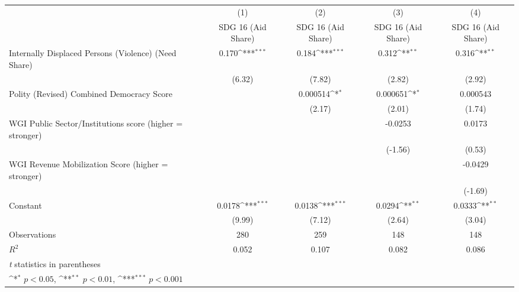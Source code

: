 {
\def\sym#1{\ifmmode^{#1}\else\(^{#1}\)\fi}
\begin{tabular}{l*{4}{c}}
\hline\hline
                &\multicolumn{1}{c}{(1)}&\multicolumn{1}{c}{(2)}&\multicolumn{1}{c}{(3)}&\multicolumn{1}{c}{(4)}\\
                &\multicolumn{1}{c}{SDG 16 (Aid Share)}&\multicolumn{1}{c}{SDG 16 (Aid Share)}&\multicolumn{1}{c}{SDG 16 (Aid Share)}&\multicolumn{1}{c}{SDG 16 (Aid Share)}\\
\hline
Internally Displaced Persons (Violence) (Need Share)&    0.170\sym{***}&    0.184\sym{***}&    0.312\sym{**} &    0.316\sym{**} \\
                &   (6.32)         &   (7.82)         &   (2.82)         &   (2.92)         \\
[1em]
Polity (Revised) Combined Democracy Score&                  & 0.000514\sym{*}  & 0.000651\sym{*}  & 0.000543         \\
                &                  &   (2.17)         &   (2.01)         &   (1.74)         \\
[1em]
WGI Public Sector/Institutions score (higher = stronger)&                  &                  &  -0.0253         &   0.0173         \\
                &                  &                  &  (-1.56)         &   (0.53)         \\
[1em]
WGI Revenue Mobilization Score (higher = stronger)&                  &                  &                  &  -0.0429         \\
                &                  &                  &                  &  (-1.69)         \\
[1em]
Constant        &   0.0178\sym{***}&   0.0138\sym{***}&   0.0294\sym{**} &   0.0333\sym{**} \\
                &   (9.99)         &   (7.12)         &   (2.64)         &   (3.04)         \\
\hline
Observations    &      280         &      259         &      148         &      148         \\
\(R^{2}\)       &    0.052         &    0.107         &    0.082         &    0.086         \\
\hline\hline
\multicolumn{5}{l}{\footnotesize \textit{t} statistics in parentheses}\\
\multicolumn{5}{l}{\footnotesize \sym{*} \(p<0.05\), \sym{**} \(p<0.01\), \sym{***} \(p<0.001\)}\\
\end{tabular}
}

